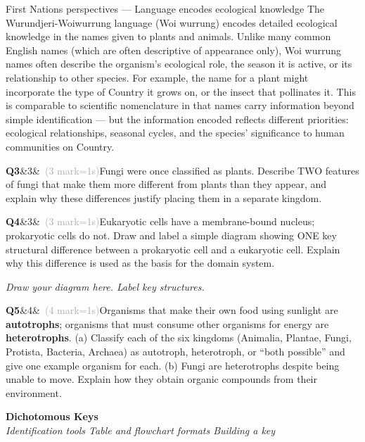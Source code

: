 \documentclass[11pt,a4paper]{article}
\newcommand{\sectiondiv}[3]{%
  \needspace{5\baselineskip}
  \begin{tcolorbox}[
    enhanced, breakable=false, arc=3.5mm,
    colback=ForestDark, colframe=ForestDark, boxrule=0pt,
    sidebyside, sidebyside align=center,
    lefthand width=2.0cm,
    left=2mm, right=4mm, top=4mm, bottom=4mm
  ]
    \begin{center}
      \label{sec:#1}%
      {\headingfont\bfseries\color{Forest!35!ForestDark}\fontsize{50}{50}\selectfont #1}
    \end{center}
    \tcblower
    {\headingfont\bfseries\color{white}\LARGE #2}\\[3pt]
    {\itshape\color{white!75!ForestDark}\small #3}
  \end{tcolorbox}%
}
\newcommand{\answerbox}[1]{%
  \begin{tcolorbox}[
    enhanced, breakable, arc=2mm,
    colback=Paper, colframe=Line,
    left=2mm, right=2mm, top=1mm, bottom=1mm,
    boxrule=1pt,
    height=#1
  ]
  \end{tcolorbox}%
}
\newcommand{\question}[3]{%
  \needspace{3\baselineskip}%
  \medskip
  \noindent\textbf{Q#1}\ifx&#2&\else\ \textcolor{DarkGrey}{(#2 mark\ifnum#2=1\else s\fi)}\fi\quad #3%
  \medskip
}
\begin{document}
\begin{fnbox}{First Nations perspectives --- Language encodes ecological knowledge}
The Wurundjeri-Woiwurrung language (Woi wurrung) encodes detailed ecological knowledge in the names given to plants and animals. Unlike many common English names (which are often descriptive of appearance only), Woi wurrung names often describe the organism's ecological role, the season it is active, or its relationship to other species. For example, the name for a plant might incorporate the type of Country it grows on, or the insect that pollinates it. This is comparable to scientific nomenclature in that names carry information beyond simple identification --- but the information encoded reflects different priorities: ecological relationships, seasonal cycles, and the species' significance to human communities on Country.
\end{fnbox}

\begin{yr8box}
\question{3}{3}{Fungi were once classified as plants. Describe TWO features of fungi that make them more different from plants than they appear, and explain why these differences justify placing them in a separate kingdom.}
\answerbox{4cm}

\question{4}{3}{Eukaryotic cells have a membrane-bound nucleus; prokaryotic cells do not. Draw and label a simple diagram showing ONE key structural difference between a prokaryotic cell and a eukaryotic cell. Explain why this difference is used as the basis for the domain system.}

\vspace{4pt}
\begin{tcolorbox}[colback=white, colframe=MidGrey, height=5cm, boxrule=0.5pt]
\textit{\color{MidGrey}Draw your diagram here. Label key structures.}
\end{tcolorbox}

\question{5}{4}{Organisms that make their own food using sunlight are \textbf{autotrophs}; organisms that must consume other organisms for energy are \textbf{heterotrophs}. (a) Classify each of the six kingdoms (Animalia, Plantae, Fungi, Protista, Bacteria, Archaea) as autotroph, heterotroph, or ``both possible'' and give one example organism for each. (b) Fungi are heterotrophs despite being unable to move. Explain how they obtain organic compounds from their environment.}
\answerbox{5.5cm}
\end{yr8box}

\newpage

\sectiondiv{4}{Dichotomous Keys}{Identification tools \textbullet{} Table and flowchart formats \textbullet{} Building a key}
\end{document}
